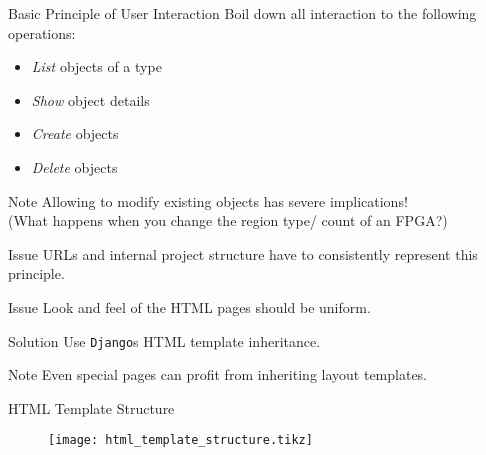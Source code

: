\documentclass{beamer}
\newcommand{\django}{\texttt{Django}}
\begin{document}
    \begin{frame}[allowframebreaks]{Basic Principle of User Interaction}
        Boil down all interaction to the following operations:
        \begin{itemize}
            \item \emph{List} objects of a type
            \item \emph{Show} object details
            \item \emph{Create} objects
            \item \emph{Delete} objects
        \end{itemize}

        \begin{block}{Note}
            Allowing to modify existing objects has severe implications! \\
            (What happens when you change the region type/ count of an FPGA?)
        \end{block}
        
    \framebreak
    
        \begin{alertblock}{Issue}
            URLs and internal project structure have to consistently represent this principle.
        \end{alertblock}
    
        \begin{alertblock}{Issue}
            Look and feel of the HTML pages should be uniform.
        \end{alertblock}
    
        \begin{exampleblock}{Solution}
            Use \django s HTML template inheritance.
        \end{exampleblock}

        \begin{block}{Note}
            Even special pages can profit from inheriting layout templates.
        \end{block}
    
    \end{frame}
    
    \begin{frame}[fragile]{HTML Template Structure}
        \begin{figure}
            \centering
            \texttt{[image: html\_template\_structure.tikz]}
        \end{figure}
    \end{frame}
    
\end{document}
